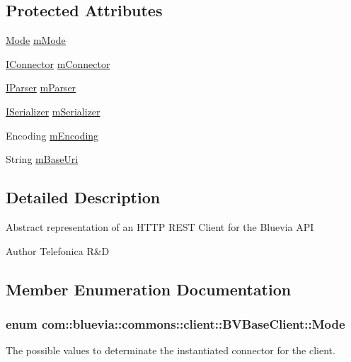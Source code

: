 \subsection*{Protected Attributes}
\begin{DoxyCompactItemize}
\item 
\hyperlink{classcom_1_1bluevia_1_1commons_1_1client_1_1BVBaseClient_a5f4a4a27d73a8ddd0ce450a6c7a4d1b7}{Mode} \hyperlink{classcom_1_1bluevia_1_1commons_1_1client_1_1BVBaseClient_ac5317f34c5d1db5bdd74ac1351db1f7e}{mMode}
\item 
\hyperlink{interfacecom_1_1bluevia_1_1commons_1_1connector_1_1IConnector}{IConnector} \hyperlink{classcom_1_1bluevia_1_1commons_1_1client_1_1BVBaseClient_ade6229b64e834d37ac7abadb1a13dbbd}{mConnector}
\item 
\hyperlink{interfacecom_1_1bluevia_1_1commons_1_1parser_1_1IParser}{IParser} \hyperlink{classcom_1_1bluevia_1_1commons_1_1client_1_1BVBaseClient_a8a0cf4418292e19e112fadd545eb6845}{mParser}
\item 
\hyperlink{interfacecom_1_1bluevia_1_1commons_1_1parser_1_1ISerializer}{ISerializer} \hyperlink{classcom_1_1bluevia_1_1commons_1_1client_1_1BVBaseClient_aed01ee968cac635b250b9c3dece84648}{mSerializer}
\item 
Encoding \hyperlink{classcom_1_1bluevia_1_1commons_1_1client_1_1BVBaseClient_a8498a310d0ac85b785d08b9e4a4a2fd3}{mEncoding}
\item 
String \hyperlink{classcom_1_1bluevia_1_1commons_1_1client_1_1BVBaseClient_a2527dcdb00803098408979b43ed394d6}{mBaseUri}
\end{DoxyCompactItemize}


\subsection{Detailed Description}
Abstract representation of an HTTP REST Client for the Bluevia API

\begin{DoxyAuthor}{Author}
Telefonica R\&D 
\end{DoxyAuthor}


\subsection{Member Enumeration Documentation}
\hypertarget{classcom_1_1bluevia_1_1commons_1_1client_1_1BVBaseClient_a5f4a4a27d73a8ddd0ce450a6c7a4d1b7}{
\subsubsection[{Mode}]{\setlength{\rightskip}{0pt plus 5cm}enum {\bf com::bluevia::commons::client::BVBaseClient::Mode}}}
\label{classcom_1_1bluevia_1_1commons_1_1client_1_1BVBaseClient_a5f4a4a27d73a8ddd0ce450a6c7a4d1b7}
The possible values to determinate the instantiated connector for the client.

